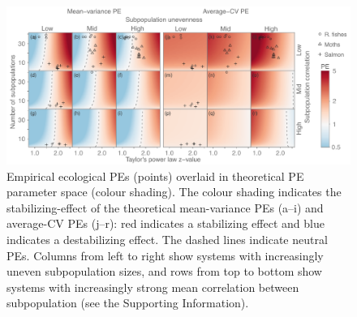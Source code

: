\clearpage
\begin{figure}[htbp]
  \centering
  \includegraphics[width=\textwidth]{prophets/fig5}
  \caption[Empirical ecological PEs overlaid in theoretical PE
    parameter space.]{
  Empirical ecological PEs (points) overlaid in theoretical PE
    parameter space (colour shading). The colour shading indicates the
    stabilizing-effect of the theoretical mean-variance PEs (a--i) and
    average-CV PEs (j--r): red indicates a stabilizing effect and blue indicates
    a destabilizing effect.
    The dashed lines indicate neutral PEs. Columns from left to right
    show systems with increasingly uneven subpopulation sizes,
    and rows from top to bottom show systems with increasingly strong mean
    correlation between subpopulation (see the Supporting
    Information).
  } \label{fig:paramspace}
\end{figure}

